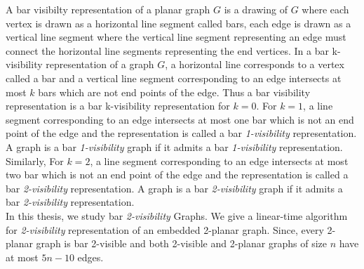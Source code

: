 
A bar visibilty representation of a planar graph $G$ is a drawing of $G$ where each vertex is drawn as a horizontal line segment called bars, each edge is drawn as a vertical line segment where the vertical line segment representing an edge must connect the horizontal line segments representing the end vertices. In a bar k-visibility representation of a graph $G$, a horizontal line corresponds to a vertex called a bar and a vertical line segment corresponding to an edge intersects at most $k$ bars which are not end points of the edge. Thus a bar visibility representation is a bar k-visibility representation for $k = 0$. For $k = 1$, a line segment corresponding to an edge intersects at most one bar which is not an end point of the edge and the representation is called a bar \emph{1-visibility}  representation. A graph is a bar \emph{1-visibility} graph if it admits a bar \emph{1-visibility} representation. Similarly, For $k = 2$, a line segment corresponding to an edge intersects at most two bar which is not an end point of the edge and the representation is called a bar \emph{2-visibility} representation. A graph is a bar \emph{2-visibility} graph if it admits a bar \emph{ 2-visibility} representation.
\\

In this thesis, we study bar \emph{2-visibility} Graphs. We give a linear-time algorithm for \emph{2-visibility} representation of an embedded 2-planar graph. Since, every 2-planar graph is bar 2-visible and both 2-visible and 2-planar graphs of size $n$ have at most $5n-10$ edges.

\endinput